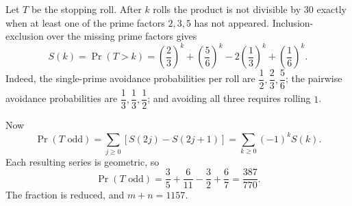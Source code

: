 Let $T$ be the stopping roll. After $k$ rolls the product is not divisible by $30$ exactly when at least one of the prime factors $2,3,5$ has not appeared. Inclusion-exclusion over the missing prime factors gives
\[
S(k)=\Pr(T>k)
=\left(\dfrac{2}{3}\right)^k+\left(\dfrac{5}{6}\right)^k
-2\left(\dfrac{1}{3}\right)^k+\left(\dfrac{1}{6}\right)^k.
\]
Indeed, the single-prime avoidance probabilities per roll are $\dfrac{1}{2},\dfrac{2}{3},\dfrac{5}{6}$; the pairwise avoidance probabilities are $\dfrac{1}{3},\dfrac{1}{3},\dfrac{1}{2}$; and avoiding all three requires rolling $1$.

Now
\[
\Pr(T\text{ odd})=\sum_{j\ge0}[S(2j)-S(2j+1)]
=\sum_{k\ge0}(-1)^kS(k).
\]
Each resulting series is geometric, so
\[
\Pr(T\text{ odd})=\dfrac{3}{5}+\dfrac{6}{11}-\dfrac{3}{2}+\dfrac{6}{7}
=\dfrac{387}{770}.
\]
The fraction is reduced, and $\boxed{m+n=1157}$.

